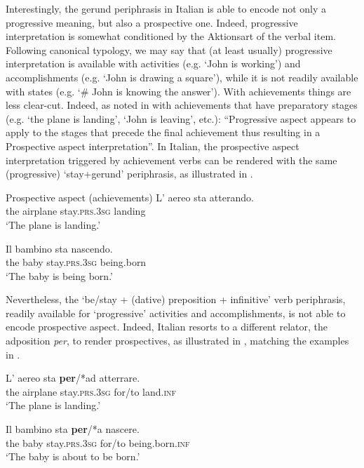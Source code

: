 \documentclass[output=paper,modfonts,nonflat,newtxmath,colorlinks,citecolor=brown]{langsci/langscibook}
\begin{document}
Interestingly, the gerund periphrasis in Italian is able to encode not only a progressive meaning, but also a prospective one. Indeed, progressive interpretation is somewhat conditioned by the Aktionsart of the verbal item. Following  canonical typology, we may say that (at least usually) progressive interpretation is available with {activities} (e.g. ‘John is working’) and {accomplishments} (e.g. ‘John is drawing a square’), while it is not readily available with {states} (e.g. ‘\# John is knowing the answer’). With {achievements} things are less clear-cut. Indeed, as noted in \citet[538]{Cinque2017} with achievements that have preparatory stages (e.g. ‘the plane is landing’, ‘John is leaving’, etc.): “Progressive aspect appears to apply to the stages that precede the final achievement thus resulting in a Prospective aspect interpretation”. In Italian, the prospective aspect interpretation triggered by achievement verbs can be rendered with the same (progressive) ‘stay+gerund’ periphrasis, as illustrated in .

\ea Prospective aspect (achievements)%
	\label{ex:franco:22}
    \ea \label{ex:franco:22a}
    \gll L’ aereo sta atterando.\\
        	the airplane stay.\textsc{prs.3sg} landing\\
    \glt ‘The plane is landing.’

     \ex \label{ex:franco:22b}
    \gll Il bambino sta nascendo.  \\
        the baby stay.\textsc{prs.3sg} being.born\\
    \glt ‘The baby is being born.’
    \z
    \z

Nevertheless, the ‘be/stay + (dative) preposition + infinitive’ verb periphrasis, readily available for ‘progressive’ activities and accomplishments, is not able to encode prospective aspect. Indeed, Italian resorts to a different relator, the adposition \textit{per}, to render prospectives, as illustrated in , matching the examples in .

\ea%
	\label{ex:franco:23}
    \ea \label{ex:franco:23a}
    \gll L’ aereo sta \textbf{per}/*ad atterrare.\\
       the airplane stay.\textsc{prs.3sg} for/to land.\textsc{inf}\\
    \glt  ‘The plane is landing.’

     \ex \label{ex:franco:23b}
    \gll  Il bambino sta \textbf{per}/*a nascere.\\
        the baby stay.\textsc{prs.3sg} for/to being.born.\textsc{inf}\\
    \glt ‘The baby is about to be born.’
    \z
    \z
\end{document}
